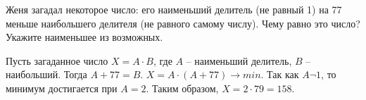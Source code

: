 
Женя загадал некоторое число: его наименьший делитель (не равный 1) на 77 меньше наибольшего делителя (не равного самому числу). Чему равно это число? Укажите наименьшее из возможных.

\solutionSection

Пусть загаданное число $X = A \cdot B$, где $A$ -- наименьший делитель, $B$ -- наибольший. Тогда $A + 77 = B$. $X = A \cdot (A + 77) \to min$. Так как $A \neg 1$, то минимум достигается при $A = 2$. Таким образом, $X = 2 \cdot 79 = 158$.

